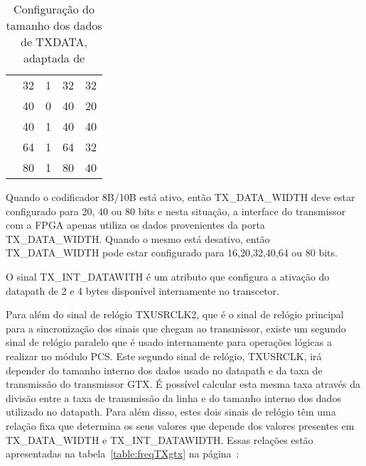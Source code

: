 \begin{enumerate}
\begin{table}[]
\begin{tabular}{|c|c|c|c|c|}
		& 32                       & 1                           & 32                                                                                      & 32                                                                                   \\ \cline{2-5} 
		& 40                       & 0                           & 40                                                                                      & 20                                                                                   \\ \cline{2-5} 
		& 40                       & 1                           & 40                                                                                      & 40                                                                                   \\ \cline{2-5} 
		& 64                       & 1                           & 64                                                                                      & 32                                                                                   \\ \cline{2-5} 
		& 80                       & 1                           & 80                                                                                      & 40                                                                                   \\ \hline
	\end{tabular}
	\caption{Configuração do tamanho dos dados de TXDATA, adaptada de \cite{R011}}
	\label{table:dataTXDATA}
\end{table}

	\hspace{1.0em}Quando o codificador 8B/10B está ativo, então TX\_DATA\_WIDTH deve estar configurado para 20, 40 ou 80 bits e nesta situação, a interface do transmissor com a FPGA apenas utiliza os dados provenientes da porta TX\_DATA\_WIDTH. Quando o mesmo está desativo, então TX\_DATA\_WIDTH pode estar configurado para 16,20,32,40,64 ou 80 bits.

	\hspace{1.0em}O sinal TX\_INT\_DATAWITH é um atributo que configura a ativação do datapath de 2 e 4 bytes disponível internamente no transcetor.

	\hspace{1.0em}Para além do sinal de relógio TXUSRCLK2, que é o sinal de relógio principal para a sincronização dos sinais que chegam ao transmissor, existe um segundo sinal de relógio paralelo que é usado internamente para operações lógicas a realizar no módulo PCS. Este segundo sinal de relógio, TXUSRCLK, irá depender do tamanho interno dos dados usado no datapath e da taxa de transmissão do transmissor GTX. É possível calcular esta mesma taxa através da divisão entre a taxa de transmissão da linha e do tamanho interno dos dados utilizado no datapath. Para além disso, estes dois sinais de relógio têm uma relação fixa que determina os seus valores que depende dos valores presentes em TX\_DATA\_WIDTH e TX\_INT\_DATAWIDTH. Essas relações estão apresentadas na tabela~\ref{table:freqTXgtx} na página~\pageref{table:freqTXgtx}:


\end{enumerate}
